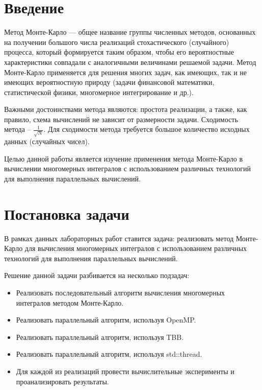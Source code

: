 \documentclass{report}
\begin{document}
\setcounter{page}{2}

\tableofcontents
\newpage

\section*{Введение}
Метод Монте-Карло — общее название группы численных методов, основанных на получении большого числа реализаций стохастического (случайного) процесса, который формируется таким образом, чтобы его вероятностные характеристики совпадали с аналогичными величинами решаемой задачи. Метод Монте-Карло применяется для решения многих задач, как
имеющих, так и не имеющих вероятностную природу (задачи финансовой математики, статистической физики, многомерное интегрирование и др.).
\par Важными достоинствами метода являются: простота реализации, а также, как правило, схема вычислений не зависит от размерности задачи. Сходимость метода – $\frac{1}{\sqrt{N}}$. Для сходимости метода требуется большое количество исходных данных (случайных чисел).
\par Целью данной работы является изучение применения метода Монте-Карло в вычислении многомерных интегралов с использованием различных технологий для выполнения параллельных вычислений.
\newpage

\section*{Постановка задачи}
В рамках данных лабораторных работ ставится задача: реализовать метод Монте-Карло для вычисления многомерных интегралов с использованием различных технологий для выполнения параллельных вычислений.
\par Решение данной задачи разбивается на несколько подзадач:
\begin{itemize}
\item Реализовать последовательный алгоритм вычисления многомерных интегралов методом Монте-Карло.
\item Реализовать параллельный алгоритм, используя OpenMP.
\item Реализовать параллельный алгоритм, используя TBB.
\item Реализовать параллельный алгоритм, используя std::thread.
\item Для каждой из реализаций провести вычислительные эксперименты и проанализировать результаты.
\end{itemize}
\end{document}
